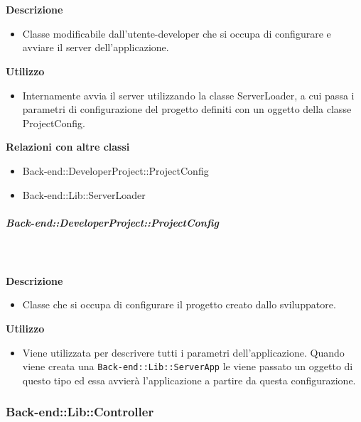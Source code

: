         \textbf{\\ \\ Descrizione} 
          \begin{itemize}
            \item[] Classe modificabile dall'utente-developer che si occupa di configurare e avviare il server dell'applicazione.
          \end{itemize}      
        \textbf{Utilizzo}  
          \begin{itemize}
            \item[] Internamente avvia il server utilizzando la classe ServerLoader, a cui passa i parametri di configurazione del progetto definiti con un oggetto della classe ProjectConfig.
          \end{itemize}
          \textbf{Relazioni con altre classi}
          \begin{itemize}
              \item{Back-end::DeveloperProject::ProjectConfig}
              \item{Back-end::Lib::ServerLoader}
          \end{itemize}
      \subparagraph{Back-end::DeveloperProject::ProjectConfig}
        
        \textbf{\\ \\ Descrizione} 
          \begin{itemize}
            \item[] Classe che si occupa di configurare il progetto creato dallo sviluppatore.
          \end{itemize}      
        \textbf{Utilizzo}  
          \begin{itemize}
            \item[] Viene utilizzata per descrivere tutti i parametri dell'applicazione. Quando viene creata una \texttt{Back-end::Lib::ServerApp} le viene passato un oggetto di questo tipo ed essa avvierà l'applicazione a partire da questa configurazione.
          \end{itemize}
  \subsubsection{Back-end::Lib::Controller}
